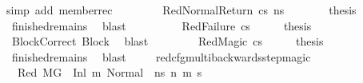 \begin{isabellebody}
\ {\isacharparenleft}{\kern0pt}simp\ add{\isacharcolon}{\kern0pt}\ member{\isacharunderscore}{\kern0pt}rec{\isacharparenleft}{\kern0pt}{}{\isacharparenright}{\kern0pt}{\isacharparenright}{\kern0pt}\ \ \isanewline
\ \ \isamarkupfalse%
\isanewline
\ \ \isamarkupfalse%
\ {\isacharparenleft}{\kern0pt}RedNormalReturn\ cs\ ns{\isacharprime}{\kern0pt}{\isacharparenright}{\kern0pt}\isanewline
\ \ \ \ \isamarkupfalse%
\ \isamarkupfalse%
\ {\isacharquery}{\kern0pt}thesis\ \isamarkupfalse%
\ {}\ finished{\isacharunderscore}{\kern0pt}remains\ \isamarkupfalse%
\ blast\ \isanewline
\ \ \isamarkupfalse%
\isanewline
\ \ \ \ \isamarkupfalse%
\ {\isacharparenleft}{\kern0pt}RedFailure\ cs{\isacharparenright}{\kern0pt}\isanewline
\ \ \isamarkupfalse%
\ \isamarkupfalse%
\ {\isacharquery}{\kern0pt}thesis\ \isamarkupfalse%
\ {}\ BlockCorrect\ Block\ \isamarkupfalse%
\ blast\isanewline
\ \ \isamarkupfalse%
\isanewline
\ \ \ \ \isamarkupfalse%
\ {\isacharparenleft}{\kern0pt}RedMagic\ cs{\isacharparenright}{\kern0pt}\isanewline
\ \ \isamarkupfalse%
\ \isamarkupfalse%
\ {\isacharquery}{\kern0pt}thesis\ \isamarkupfalse%
\ {}\ finished{\isacharunderscore}{\kern0pt}remains\ \isamarkupfalse%
\ blast\ \isanewline
\ \ \isamarkupfalse%
\isanewline
{}\isamarkupfalse%
%
\endisatagproof
{\isafoldproof}%
%
\isadelimproof
\isanewline
%
\endisadelimproof
\isanewline
{}\isamarkupfalse%
\ red{\isacharunderscore}{\kern0pt}cfg{\isacharunderscore}{\kern0pt}multi{\isacharunderscore}{\kern0pt}backwards{\isacharunderscore}{\kern0pt}step{\isacharunderscore}{\kern0pt}magic{\isacharcolon}{\kern0pt}\isanewline
\ \ \isanewline
\ \ \ Red{\isacharcolon}{\kern0pt}\ {\isachardoublequoteopen}M{\isacharcomma}{\kern0pt}{\isasymLambda}{\isacharcomma}{\kern0pt}{\isasymGamma}{\isacharcomma}{\kern0pt}{\isasymOmega}{\isacharcomma}{\kern0pt}G\ {\isasymturnstile}\ {\isacharparenleft}{\kern0pt}Inl\ m{\isacharcomma}{\kern0pt}\ {\isacharparenleft}{\kern0pt}Normal\ \ n{\isacharunderscore}{\kern0pt}s{\isacharparenright}{\kern0pt}{\isacharparenright}{\kern0pt}\ {\isacharminus}{\kern0pt}n{\isasymrightarrow}{\isacharasterisk}{\kern0pt}\ {\isacharparenleft}{\kern0pt}m{\isacharprime}{\kern0pt}{\isacharcomma}{\kern0pt}\ s{\isacharprime}{\kern0pt}{\isacharparenright}{\kern0pt}{\isachardoublequoteclose}\ \isanewline

\end{isabellebody}
